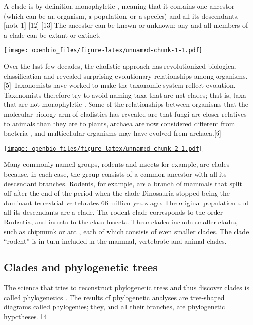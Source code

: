 \documentclass[
]{book}
\begin{document}
A clade is by definition monophyletic , meaning that it contains one ancestor (which can be an organism, a population, or a species) and all its descendants.{[}note 1{]} {[}12{]} {[}13{]} The ancestor can be known or unknown; any and all members of a clade can be extant or extinct.

\href{https://upload.wikimedia.org/wikipedia/commons/thumb/4/46/Clade-grade_II.svg/640px-Clade-grade_II.svg.png}{\texttt{[image: openbio\_files/figure-latex/unnamed-chunk-1-1.pdf]}}

Over the last few decades, the cladistic approach has revolutionized biological classification and revealed surprising evolutionary relationships among organisms.{[}5{]} Taxonomists have worked to make the taxonomic system reflect evolution. Taxonomists therefore try to avoid naming taxa that are not clades; that is, taxa that are not monophyletic . Some of the relationships between organisms that the molecular biology arm of cladistics has revealed are that fungi are closer relatives to animals than they are to plants, archaea are now considered different from bacteria , and multicellular organisms may have evolved from archaea.{[}6{]}

\href{https://upload.wikimedia.org/wikipedia/commons/1/11/Cladogram_Crocodilia_NL.PNG}{\texttt{[image: openbio\_files/figure-latex/unnamed-chunk-2-1.pdf]}}

Many commonly named groups, rodents and insects for example, are clades because, in each case, the group consists of a common ancestor with all its descendant branches. Rodents, for example, are a branch of mammals that split off after the end of the period when the clade Dinosauria stopped being the dominant terrestrial vertebrates 66 million years ago. The original population and all its descendants are a clade. The rodent clade corresponds to the order Rodentia, and insects to the class Insecta. These clades include smaller clades, such as chipmunk or ant , each of which consists of even smaller clades. The clade ``rodent'' is in turn included in the mammal, vertebrate and animal clades.

\hypertarget{clades-and-phylogenetic-trees}{%
\subsection{Clades and phylogenetic trees}\label{clades-and-phylogenetic-trees}}

The science that tries to reconstruct phylogenetic trees and thus discover clades is called phylogenetics . The results of phylogenetic analyses are tree-shaped diagrams called phylogenies; they, and all their branches, are phylogenetic hypotheses.{[}14{]}
\end{document}
